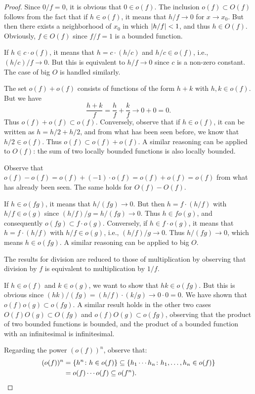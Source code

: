 \begin{proof}
Since $0/f = 0$, it is obvious that $0\in o(f)$.
The inclusion $o(f) \subset O(f)$ follows from the fact that if $h\in o(f)$, it
means that $h/f\to 0$ for $x\to x_0$. But then there exists a neighborhood of
$x_0$ in which ${\left|h/f\right|}<1$, and thus $h\in O(f)$. Obviously, $f\in O(f)$ since
$f/f=1$ is a bounded function.

If $h\in c \cdot o(f)$, it means that $h = c \cdot (h/c)$ and $h/c \in o(f)$,
i.e., $(h/c)/f \to 0$. But this is equivalent to $h/f\to 0$ since $c$ is a
non-zero constant. The case of big $O$ is handled similarly.

The set $o(f)+o(f)$ consists of functions of the form $h+k$ with $h,k \in o(f)$.
But we have
\[
  \frac{h+k}{f} = \frac{h}{f} + \frac{k}{f} \to 0 + 0 = 0.
\]
Thus $o(f)+o(f) \subset o(f)$. Conversely, observe that if $h\in o(f)$, it can
be written as $h = h/2 + h/2$, and from what has been seen before, we know that
$h/2 \in o(f)$. Thus $o(f) \subset o(f) + o(f)$.
A similar reasoning can be applied to $O(f)$: the sum of two locally bounded
functions is also locally bounded.

Observe that $o(f)-o(f) = o(f) + (-1)\cdot o(f) = o(f) + o(f) = o(f)$
from what has already been seen. The same holds for $O(f)-O(f)$.

If $h\in o(fg)$, it means that $h/(fg)\to 0$. But then $h = f\cdot (h/f)$ with
$h/f \in o(g)$ since $(h/f)/g = h/(fg)\to 0$. Thus $h \in fo(g)$, and
consequently $o(fg)\subset f \cdot o(g)$. Conversely, if $h \in f\cdot o(g)$, it
means that $h = f \cdot(h/f)$ with $h/f \in o(g)$, i.e., $(h/f)/g \to 0$. Thus
$h/(fg) \to 0$, which means $h\in o(fg)$.
A similar reasoning can be applied to big $O$.

The results for division are reduced to those of multiplication by observing
that division by $f$ is equivalent to multiplication by $1/f$.

If $h\in o(f)$ and $k\in o(g)$, we want to show that $hk\in o(fg)$.
But this is obvious since $(hk)/(fg) = (h/f)\cdot(k/g) \to 0\cdot 0 = 0$. We
have shown that $o(f)o(g)\subset o(fg)$. A similar result holds in the other two
cases $O(f)O(g)\subset O(fg)$ and $o(f)O(g)\subset o(fg)$, observing that the
product of two bounded functions is bounded, and the product of a bounded
function with an infinitesimal is infinitesimal.

Regarding the power $(o(f))^n$, observe that:
\begin{align*}
  (o(f))^n &= {\left\{ h^n \colon h\in o(f) \right\}}
      \subseteq {\left\{ h_1 \cdots h_n \colon h_1, \dots, h_n \in o(f) \right\}}\\
      &= o(f) \cdots o(f) \subseteq o(f^n).
\end{align*}


\end{proof}
